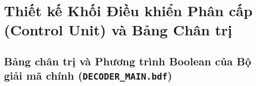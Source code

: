 \documentclass[12pt,a4paper]{report}
\begin{document}
\section{Thiết kế Khối Điều khiển Phân cấp (Control Unit) và Bảng Chân trị}

\subsection{Bảng chân trị và Phương trình Boolean của Bộ giải mã chính (\texttt{DECODER\_MAIN.bdf})}
\begin{table}[H]
\centering
\caption{Bảng chân trị các tín hiệu điều khiển của khối giải mã chính (\texttt{DECODER\_MAIN.bdf})}
\label{tab:main_decoder_truth_table}
\setlength{\tabcolsep}{3.5pt}
\end{table}
\end{document}
